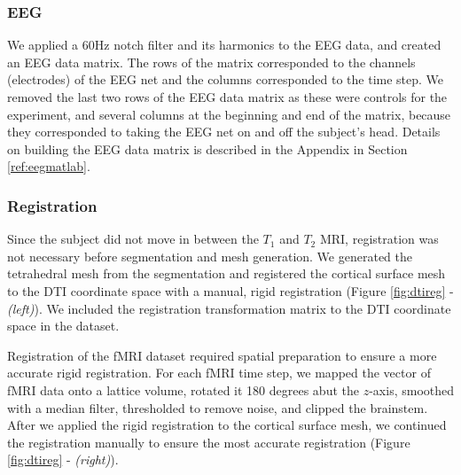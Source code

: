 \subsubsection{EEG}

We applied a 60Hz notch filter and its harmonics \cite{ref:filter} to the EEG data, and created an EEG data matrix. The rows of the matrix corresponded to the channels (electrodes) of the EEG net and the columns corresponded to the time step. We removed the last two rows of the EEG data matrix as these were controls for the experiment, and several columns at the beginning and end of the matrix, because they corresponded to taking the EEG net on and off the subject's head. Details on building the EEG data matrix is described in the Appendix in Section \ref{ref:eegmatlab}. 

\subsubsection{Registration}
\label{sec:reg}

Since the subject did not move in between the $T_1$ and $T_2$ MRI, registration was not necessary before segmentation and mesh generation. We generated the tetrahedral mesh from the segmentation and registered the cortical surface mesh to the DTI coordinate space with a manual, rigid registration (Figure \ref{fig:dtireg} - \textit{(left)}). We included the registration transformation matrix to the DTI coordinate space in the dataset. 

Registration of the fMRI dataset required spatial preparation to ensure a more accurate rigid registration. For each fMRI time step, we mapped the vector of fMRI data onto a lattice volume, rotated it 180 degrees abut the $z$-axis, smoothed with a median filter, thresholded to remove noise, and clipped the brainstem. After we applied the rigid registration to the cortical surface mesh, we continued the registration manually to ensure the most accurate registration (Figure \ref{fig:dtireg} - \textit{(right)}). 

